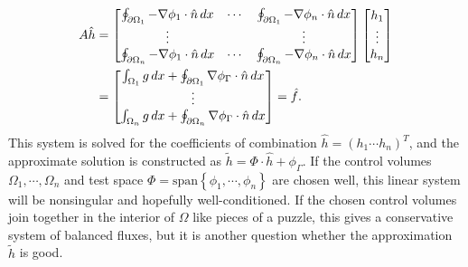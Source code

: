 \newcommand{\integralentry}[2]{\oint_{\pom_{#1}}-\nabla\phi_{#2}\cdot\hat{n}\,dx}
\newcommand{\integralrhsentry}[1]{\int_{\om_{#1}}g\,dx + \oint_{\pom_{#1}}\nabla\phi_\Gamma\cdot\hat{n}\,dx}
\begin{equation}\label{poisson_matrix_equation}
\begin{split}
    A\hat{h}
    &= \begin{bmatrix}
            \integralentry{1}{1} & \cdots & \integralentry{1}{n} \\
            \vdots & & \vdots \\
            \integralentry{n}{1} & \cdots & \integralentry{n}{n}
    \end{bmatrix}
    \begin{bmatrix} h_1 \\ \vdots \\ h_n \end{bmatrix}
    \\
    &= \begin{bmatrix} \integralrhsentry{1} \\ \vdots \\ \integralrhsentry{n}  \end{bmatrix}
    = \hat{f}.
\end{split}
\end{equation}
This system is solved for the coefficients of combination $\hat{h} = (h_1 \cdots h_n)^T$, and the approximate
solution is constructed as $\tilde{h} = \Phi\cdot\hat{h} + \phi_\Gamma$.
If the control volumes $\Omega_1,\cdots,\Omega_n$ and test space $\Phi = \text{span}\left\{\phi_1,\cdots,\phi_n\right\}$
are chosen well, this linear system will be nonsingular and hopefully well-conditioned.
If the chosen control volumes join together in the interior of $\Omega$ like pieces of a puzzle, this gives a conservative system of balanced fluxes, but it is another question whether the approximation
$\tilde{h}$ is good.

\newpage
